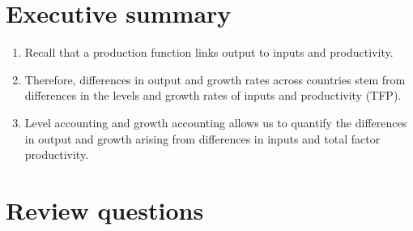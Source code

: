 \section*{Executive summary}

\setlength{\leftmargini}{.5\oldleftmargini}
\begin{enumerate}
\item Recall that a production function links output to inputs and productivity.

\item Therefore, differences in output and growth rates across countries
stem from differences in the levels and growth rates
of inputs and productivity (TFP).

\item Level accounting and growth accounting allows us to quantify
the differences in output and growth arising from differences in inputs and total factor productivity.
\end{enumerate}
\setlength{\leftmargini}{\oldleftmargini}

\section*{Review questions}

